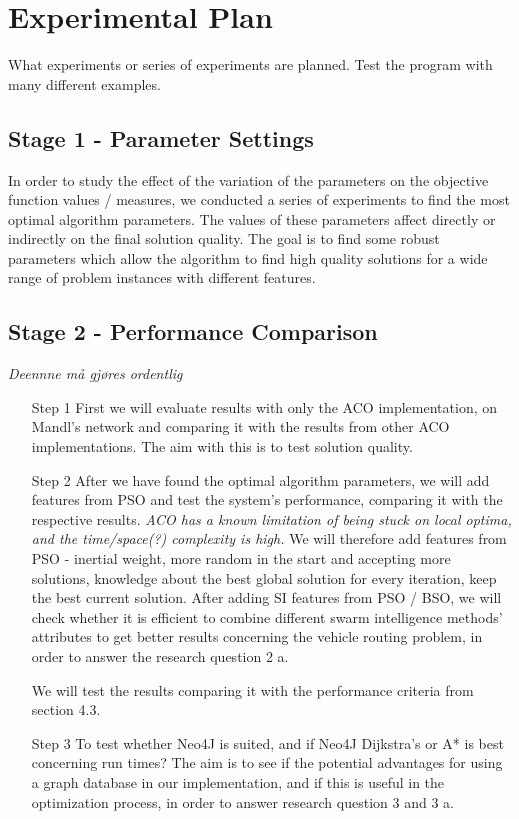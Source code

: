 \section{Experimental Plan}

What experiments or series of experiments are planned. Test the program with many different examples.



\subsection{Stage 1 - Parameter Settings}
\label{subsec:parameterSettings_plan}

In order to study the effect of the variation of the parameters on the objective function values / measures, we conducted a series of experiments to find the most optimal algorithm parameters. The values of these parameters affect directly or indirectly on the final solution quality. The goal is to find some robust parameters which allow the algorithm to find high quality solutions for a wide range of problem instances with different features. 

\subsection{Stage 2 - Performance Comparison}
\emph{\color{red}Deennne må gjøres ordentlig}
\begin{itemize}
\item[Step 1] First we will evaluate results with only the ACO implementation, on Mandl's network and comparing it with the results from other ACO implementations. The aim with this is to test solution quality.

\item[Step 2]After we have found the optimal algorithm parameters, we will add features from PSO and test the system's performance, comparing it with the respective results. \emph{\color{red}ACO has a known limitation of being stuck on local optima, and the time/space(?) complexity is high.} We will therefore 
add features from PSO - inertial weight, more random in the start and accepting more solutions, knowledge about the best global solution for every iteration, keep the best current solution. After adding SI features from PSO / BSO, we will check whether it is efficient to combine different swarm intelligence methods' attributes to get better results concerning the vehicle routing problem, in order to answer the research question 2 a.

We will test the results comparing it with the performance criteria from section 4.3.

\item[Step 3]To test whether Neo4J is suited, and if Neo4J Dijkstra's or A* is best concerning run times? The aim is to see if the potential advantages for using a graph database in our implementation, and if this is useful in the optimization process, in order to answer research question 3 and 3 a.

\end{itemize}

